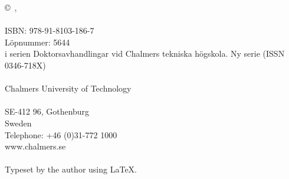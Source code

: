 %
%
%
%
%
%
%
%
%
%
%
%
%
%
%
%
%
%
%
%
%
%
%


\thispagestyle{empty}

\vspace*{8.9 cm}

\noindent\textbf{\thesistitle}\\
\ifdefined \thesissubtitle \if \thesissubtitle\empty\else
    \noindent\footnotesize{\textit{\thesissubtitle}}\\
\fi\fi\\
\normalsize
\MakeUppercase{\thesisauthor}\\
\\
\copyright~{\MakeUppercase{\thesisauthor}},~\thesisyear\\ 
\\
ISBN: 978-91-8103-186-7\\
Löpnummer: 5644 \\
i serien Doktorsavhandlingar vid Chalmers tekniska högskola. Ny serie (ISSN 0346-718X)\\
\\
\noindent Chalmers University of Technology \\
\thesisdepartment \\
SE-412 96, Gothenburg\\
Sweden \\
Telephone: +46 (0)31-772 1000 \\
www.chalmers.se \\
\\
Typeset by the author using \LaTeX.\\


\clearpage
